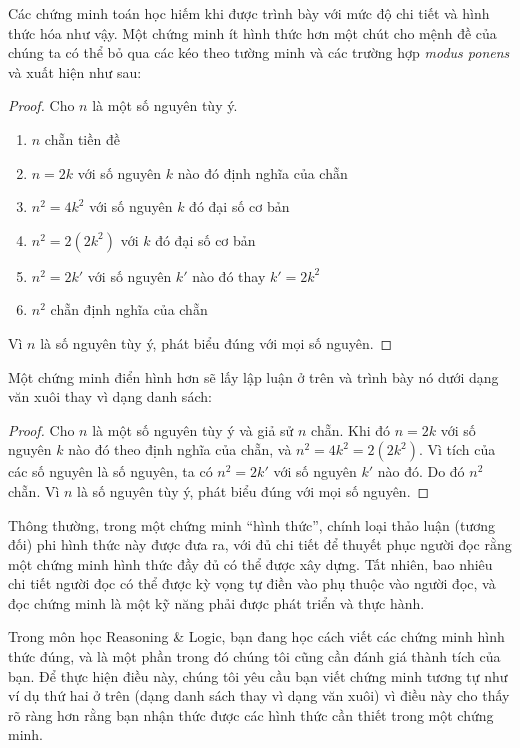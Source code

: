 Các chứng minh toán học hiếm khi được trình bày với mức độ chi tiết và hình thức hóa như vậy. Một chứng minh ít hình thức hơn một chút cho mệnh đề của chúng ta có thể bỏ qua các kéo theo tường minh và các trường hợp \emph{modus ponens} và xuất hiện như sau:

\begin{proof}
Cho $n$ là một số nguyên tùy ý.
\begin{enumerate}
\item $n$ chẵn \hfill tiền đề
\item $n = 2k$ với số nguyên $k$ nào đó \hfill định nghĩa của chẵn
\item $n^2 = 4k^2$ với số nguyên $k$ đó \hfill đại số cơ bản
\item $n^2 = 2(2k^2)$ với $k$ đó \hfill đại số cơ bản
\item $n^2 = 2k'$ với số nguyên $k'$ nào đó \hfill thay $k' = 2k^2$
\item $n^2$ chẵn \hfill định nghĩa của chẵn
\end{enumerate}
Vì $n$ là số nguyên tùy ý, phát biểu đúng với mọi số nguyên.
\end{proof}

Một chứng minh điển hình hơn sẽ lấy lập luận ở trên và trình bày nó dưới dạng văn xuôi thay vì dạng danh sách:

\begin{proof}
Cho $n$ là một số nguyên tùy ý và giả sử $n$ chẵn. Khi đó $n = 2k$ với số nguyên $k$ nào đó theo định nghĩa của chẵn, và $n^2 = 4k^2 = 2(2k^2)$. Vì tích của các số nguyên là số nguyên, ta có $n^2 = 2k'$ với số nguyên $k'$ nào đó. Do đó $n^2$ chẵn. Vì $n$ là số nguyên tùy ý, phát biểu đúng với mọi số nguyên.
\end{proof}

Thông thường, trong một chứng minh ``hình thức'', chính loại thảo luận (tương đối) phi hình thức này được đưa ra, với đủ chi tiết để thuyết phục người đọc rằng một chứng minh hình thức đầy đủ có thể được xây dựng. Tất nhiên, bao nhiêu chi tiết người đọc có thể được kỳ vọng tự điền vào phụ thuộc vào người đọc, và đọc chứng minh là một kỹ năng phải được phát triển và thực hành.

\begin{warningbox}
Trong môn học Reasoning \& Logic, bạn đang học cách viết các chứng minh hình thức đúng, và là một phần trong đó chúng tôi cũng cần đánh giá thành tích của bạn. Để thực hiện điều này, chúng tôi yêu cầu bạn viết chứng minh tương tự như ví dụ thứ hai ở trên (dạng danh sách thay vì dạng văn xuôi) vì điều này cho thấy rõ ràng hơn rằng bạn nhận thức được các hình thức cần thiết trong một chứng minh.
\end{warningbox}

